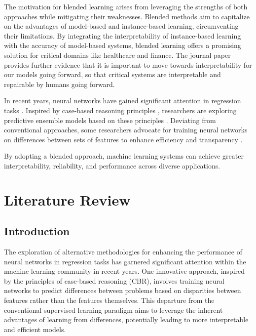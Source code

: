 \documentclass[a4paper, 12pt]{report}
\begin{document}
The motivation for blended learning arises from leveraging the strengths of both approaches while mitigating their weaknesses.
Blended methods aim to capitalize on the advantages of model-based and instance-based learning, circumventing their limitations.
By integrating the interpretability of instance-based learning with the accuracy of model-based systems, blended learning offers a promising solution for critical domains like healthcare and finance.
The journal paper \cite{rudin2019stop} provides further evidence that it is important to move towards interpretability for our models going forward, 
so that critical systems are interpretable and repairable by humans going forward.

In recent years, neural networks have gained significant attention in regression tasks \cite{neuralNetForRegression}.
Inspired by case-based reasoning principles \cite{riesbeck2013inside}, researchers are exploring predictive ensemble models based on these principles \cite{watsonCaseBasedReasoningReview}.
Deviating from conventional approaches, some researchers advocate for training neural networks on differences between sets of features to enhance efficiency and transparency \cite{learningFromDifferences2022}.

By adopting a blended approach, machine learning systems can achieve greater interpretability, reliability, and performance across diverse applications.

\chapter{Literature Review}
\label{ch:Literature Review}
\section{Introduction}

The exploration of alternative methodologies for enhancing the performance of neural networks in regression tasks 
has garnered significant attention within the machine learning community in recent years. 
One innovative approach, inspired by the principles of case-based reasoning (CBR), involves training neural networks to predict 
differences between problems based on disparities between features rather than the features themselves. 
This departure from the conventional supervised learning paradigm aims to leverage the inherent advantages of learning from differences, 
potentially leading to more interpretable and efficient models. 
\end{document}
